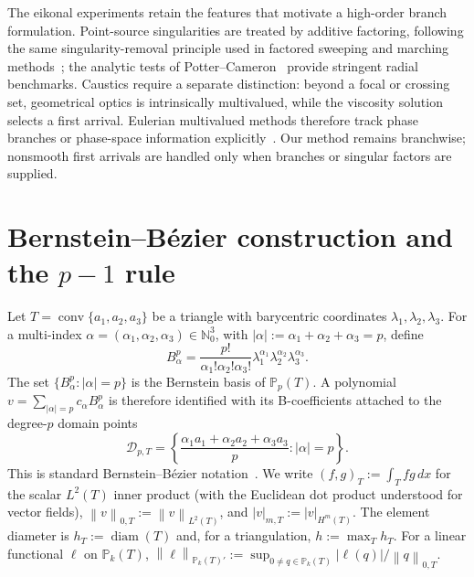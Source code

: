 \documentclass[preprint,12pt]{elsarticle}
\newcommand{\PP}{\mathbb P}
\newcommand{\D}{\mathcal D}
\newcommand{\norm}[1]{\left\lVert #1\right\rVert}
\newcommand{\abs}[1]{\left\lvert #1\right\rvert}
\begin{document}
The eikonal experiments retain the features that motivate a high-order branch formulation.  Point-source singularities are treated by additive factoring, following the same singularity-removal principle used in factored sweeping and marching methods~\cite{FomelLuoZhao2009,TreisterHaber2016}; the analytic tests of Potter--Cameron~\cite{PotterCameron2019} provide stringent radial benchmarks.  Caustics require a separate distinction: beyond a focal or crossing set, geometrical optics is intrinsically multivalued, while the viscosity solution selects a first arrival.  Eulerian multivalued methods therefore track phase branches or phase-space information explicitly~\cite{QianLeung2004,EngquistRunborg2003,Runborg2007}.  Our method remains branchwise; nonsmooth first arrivals are handled only when branches or singular factors are supplied.
\section{Bernstein--B\'ezier construction and the $p-1$ rule}\label{sec:bb}
Let $T=\operatorname{conv}\{a_1,a_2,a_3\}$ be a triangle with barycentric coordinates $\lambda_1,\lambda_2,\lambda_3$.  For a multi-index $\alpha=(\alpha_1,\alpha_2,\alpha_3)\in\mathbb N_0^3$, with $|\alpha|:=\alpha_1+\alpha_2+\alpha_3=p$, define
\begin{equation}\label{eq:bern}
 B^p_\alpha=\frac{p!}{\alpha_1!\alpha_2!\alpha_3!}
 \lambda_1^{\alpha_1}\lambda_2^{\alpha_2}\lambda_3^{\alpha_3}.
\end{equation}
The set $\{B^p_\alpha:|\alpha|=p\}$ is the Bernstein basis of $\PP_p(T)$.  A polynomial $v=\sum_{|\alpha|=p}c_\alpha B^p_\alpha$ is therefore identified with its B-coefficients attached to the degree-$p$ domain points
\[
 \D_{p,T}=\left\{\frac{\alpha_1a_1+\alpha_2a_2+\alpha_3a_3}{p}:|\alpha|=p\right\}.
\]
This is standard Bernstein--B\'ezier notation~\cite{Farin2002,LaiSchumaker2007}.  We write $(f,g)_T:=\int_T fg\,dx$ for the scalar $L^2(T)$ inner product (with the Euclidean dot product understood for vector fields), $\norm{v}_{0,T}:=\norm{v}_{L^2(T)}$, and $\abs{v}_{m,T}:=\abs{v}_{H^m(T)}$.  The element diameter is $h_T:=\operatorname{diam}(T)$ and, for a triangulation, $h:=\max_T h_T$.  For a linear functional $\ell$ on $\PP_k(T)$, $\norm{\ell}_{\PP_k(T)'}:=\sup_{0\ne q\in\PP_k(T)}|\ell(q)|/\norm{q}_{0,T}$.
\end{document}
